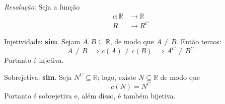 \emph{Resolução}: Seja a função
\begin{align*}
    c: \mathbb{R} &\rightarrow \mathbb{R} \\
    R &\rightarrow R^C
\end{align*}
\par Injetividade: \textbf{sim}. Sejam $A, B \subseteq \mathbb{R}$, de modo que $A \ne B$. Então temos:
    \begin{displaymath}
        A \ne B \implies c(A) \ne c(B) \implies A^C \ne B^C
    \end{displaymath}
    Portanto é injetiva.
\par Sobrejetiva: \textbf{sim}. Seja $N^C \subseteq \mathbb{R}$; logo, existe $N \subseteq \mathbb{R}$ de modo que
    \begin{displaymath}
        c(N) = N^C
    \end{displaymath}
    Portanto é sobrejetiva e, além disso, é também bijetiva.